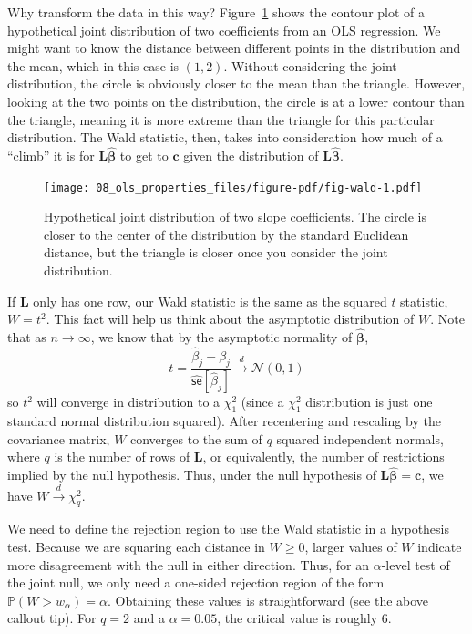 \documentclass[
  letterpaper,
  DIV=11,
  numbers=noendperiod]{scrreprt}
\newcommand{\mb}{\symbf}
\newcommand{\N}{\mathcal{N}}
\newcommand{\se}{\textsf{se}}
\renewcommand{\P}{\mathbb{P}}
\newcommand{\bhat}{\widehat{\mb{\beta}}}
\newcommand{\indist}{\overset{d}{\to}}
\theoremstyle{plain}
\theoremstyle{definition}
\theoremstyle{definition}
\theoremstyle{remark}
\begin{document}
Why transform the data in this way? Figure~\ref{fig-wald} shows the
contour plot of a hypothetical joint distribution of two coefficients
from an OLS regression. We might want to know the distance between
different points in the distribution and the mean, which in this case is
\((1, 2)\). Without considering the joint distribution, the circle is
obviously closer to the mean than the triangle. However, looking at the
two points on the distribution, the circle is at a lower contour than
the triangle, meaning it is more extreme than the triangle for this
particular distribution. The Wald statistic, then, takes into
consideration how much of a ``climb'' it is for \(\mb{L}\bhat\) to get
to \(\mb{c}\) given the distribution of \(\mb{L}\bhat\).

\begin{figure}[th]

{\centering \texttt{[image: 08\_ols\_properties\_files/figure-pdf/fig-wald-1.pdf]}

}

\caption{\label{fig-wald}Hypothetical joint distribution of two slope
coefficients. The circle is closer to the center of the distribution by
the standard Euclidean distance, but the triangle is closer once you
consider the joint distribution.}

\end{figure}

If \(\mb{L}\) only has one row, our Wald statistic is the same as the
squared \(t\) statistic, \(W = t^2\). This fact will help us think about
the asymptotic distribution of \(W\). Note that as \(n\to\infty\), we
know that by the asymptotic normality of \(\bhat\), \[ 
t = \frac{\widehat{\beta}_{j} - \beta_{j}}{\widehat{\se}[\widehat{\beta}_{j}]} \indist \N(0,1)
\] so \(t^2\) will converge in distribution to a \(\chi^2_1\) (since a
\(\chi^2_1\) distribution is just one standard normal distribution
squared). After recentering and rescaling by the covariance matrix,
\(W\) converges to the sum of \(q\) squared independent normals, where
\(q\) is the number of rows of \(\mb{L}\), or equivalently, the number
of restrictions implied by the null hypothesis. Thus, under the null
hypothesis of \(\mb{L}\bhat = \mb{c}\), we have
\(W \indist \chi^2_{q}\).

We need to define the rejection region to use the Wald statistic in a
hypothesis test. Because we are squaring each distance in \(W \geq 0\),
larger values of \(W\) indicate more disagreement with the null in
either direction. Thus, for an \(\alpha\)-level test of the joint null,
we only need a one-sided rejection region of the form
\(\P(W > w_{\alpha}) = \alpha\). Obtaining these values is
straightforward (see the above callout tip). For \(q = 2\) and a
\(\alpha = 0.05\), the critical value is roughly 6.
\end{document}
